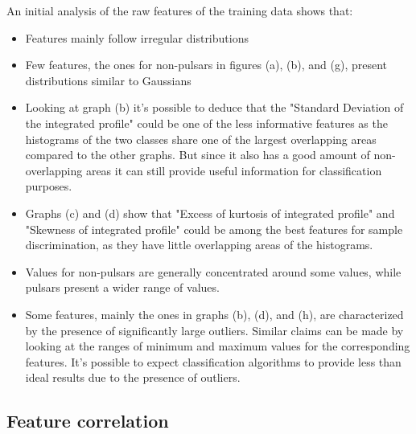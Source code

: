 \documentclass[12pt,a4paper]{article}
\begin{document}
An initial analysis of the raw features of the training data shows that:
\begin{itemize}
    \item Features mainly follow irregular distributions
    \item Few features, the ones for non-pulsars in figures (a), (b), and (g), present distributions similar to Gaussians
    \item Looking at graph (b) it's possible to deduce that the "Standard Deviation of the integrated profile" could be one of the less informative features as the histograms of the two classes share one of the largest overlapping areas compared to the other graphs. But since it also has a good amount of non-overlapping areas it can still provide useful information for classification purposes.
    \item Graphs (c) and (d) show that "Excess of kurtosis of integrated profile" and "Skewness of integrated profile" could be among the best features for sample discrimination, as they have little overlapping areas of the histograms.
    \item Values for non-pulsars are generally concentrated around some values, while pulsars present a wider range of values.
    \item Some features, mainly the ones in graphs (b), (d), and (h), are characterized by the presence of significantly large outliers. Similar claims can be made by looking at the ranges of minimum and maximum values for the corresponding features. It's possible to expect classification algorithms to provide less than ideal results due to the presence of outliers.
\end{itemize}

\subsection{Feature correlation}
\end{document}
